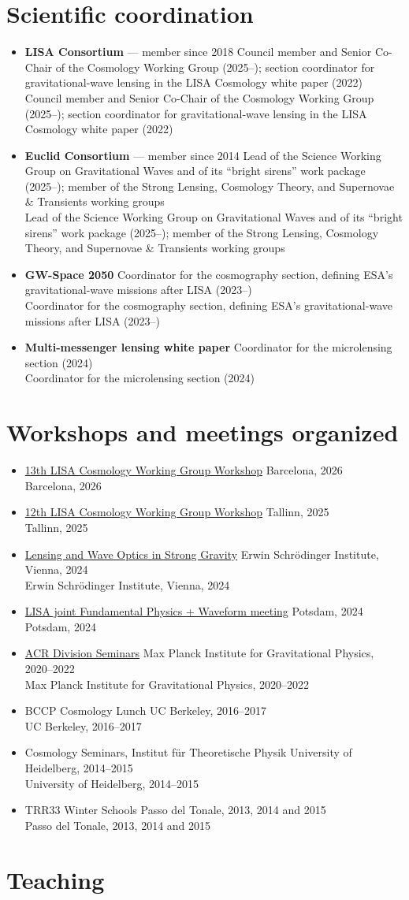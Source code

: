 \documentclass[11pt,a4paper]{article}
\newcommand{\entry}[2]{%
  \item {#1}%
  \ifx\relax#2\relax\else\\[0.1em]{\small\color{soft}#2}\fi
}
\newenvironment{entries}
  {\begin{itemize}[leftmargin=1.1em,itemsep=0.32em,parsep=0pt,topsep=0.3em]}
  {\end{itemize}}
\begin{document}
\section{Scientific coordination}
\begin{entries}
  \entry{\textbf{LISA Consortium} --- member since 2018}
        {Council member and Senior Co-Chair of the Cosmology Working Group (2025--); section
         coordinator for gravitational-wave lensing in the LISA Cosmology white paper (2022)}
  \entry{\textbf{Euclid Consortium} --- member since 2014}
        {Lead of the Science Working Group on Gravitational Waves and of its ``bright sirens''
         work package (2025--); member of the Strong Lensing, Cosmology Theory, and Supernovae
         \& Transients working groups}
  \entry{\textbf{GW-Space 2050}}
        {Coordinator for the cosmography section, defining ESA's gravitational-wave missions
         after LISA (2023--)}
  \entry{\textbf{Multi-messenger lensing white paper}}
        {Coordinator for the microlensing section (2024)}
\end{entries}

\section{Workshops and meetings organized}
\begin{entries}
  \entry{\href{https://indico.icc.ub.edu/event/677/}{13th LISA Cosmology Working Group Workshop}}
        {Barcelona, 2026}
  \entry{\href{https://indico.cern.ch/event/1488828/}{12th LISA Cosmology Working Group Workshop}}
        {Tallinn, 2025}
  \entry{\href{https://www.esi.ac.at/events/e546/}{Lensing and Wave Optics in Strong Gravity}}
        {Erwin Schrödinger Institute, Vienna, 2024}
  \entry{\href{https://workshops.aei.mpg.de/fpmeetswavelisa/}{LISA joint Fundamental Physics + Waveform meeting}}
        {Potsdam, 2024}
  \entry{\href{https://www.aei.mpg.de/139117/seminars}{ACR Division Seminars}}
        {Max Planck Institute for Gravitational Physics, 2020--2022}
  \entry{BCCP Cosmology Lunch}{UC Berkeley, 2016--2017}
  \entry{Cosmology Seminars, Institut für Theoretische Physik}{University of Heidelberg, 2014--2015}
  \entry{TRR33 Winter Schools}{Passo del Tonale, 2013, 2014 and 2015}
\end{entries}

\section{Teaching}
\end{document}
